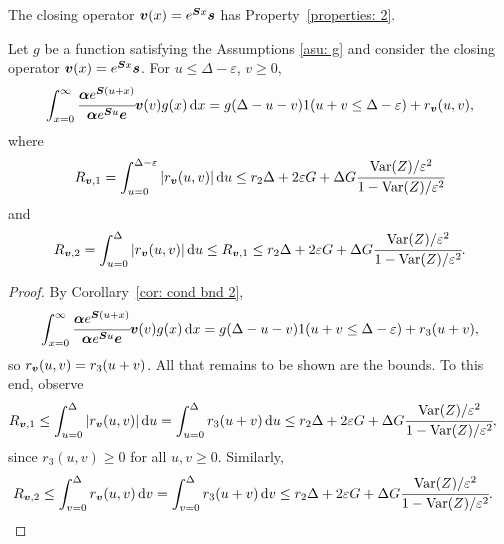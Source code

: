 \begin{cor}\label{cor: cond bnd 2 V}
	The closing operator \(\boldsymbol v(x)=e^{\boldsymbol S x}\boldsymbol s\) has Property~\ref{properties: 2}.

	Let \(g\) be a function satisfying the Assumptions \ref{asu: g} and consider the closing operator \({\boldsymbol v}(x)=e^{\boldsymbol Sx}\boldsymbol s\). For \(u\leq \Delta-\varepsilon \), \(v\geq 0\), 
	\[\int_{x=0}^\infty \cfrac{\boldsymbol \alpha  e^{\boldsymbol{S} (u+x)} }{\boldsymbol \alpha  e^{\boldsymbol{S} u} \boldsymbol e} {\boldsymbol v}(v)g(x)\, \mathrm{d} x = g(\Delta-u-v) 1(u+v\leq\Delta-\varepsilon) + r_{\boldsymbol v} (u,v),\]
	where \[\displaystyle R_{\boldsymbol v,1} = \int_{u=0}^{\Delta-\varepsilon}|r_{\boldsymbol v}(u,v)|\, \mathrm{d} u \leq r_2\Delta + 2\varepsilon G + \Delta G \cfrac{\mathrm{Var}(Z)/\varepsilon^2}{1-\mathrm{Var}(Z)/\varepsilon^2}\]
	and \[R_{\boldsymbol v,2} = \int_{u=0}^\Delta |r_{\boldsymbol v}(u,v)| \, \mathrm{d} u\leq R_{{\boldsymbol v},1}\leq r_2\Delta + 2\varepsilon G + \Delta G \cfrac{\mathrm{Var}(Z)/\varepsilon^2}{1-\mathrm{Var}(Z)/\varepsilon^2}.\] 
\end{cor}
\begin{proof}
	By Corollary~\ref{cor: cond bnd 2}, 
	\[\int_{x=0}^\infty \cfrac{\boldsymbol \alpha  e^{\boldsymbol{S} (u+x)} }{\boldsymbol \alpha  e^{\boldsymbol{S} u} \boldsymbol e} {\boldsymbol v}(v)g(x)\, \mathrm{d} x = g(\Delta-u-v) 1(u+v\leq\Delta-\varepsilon) + r_3 (u+v),\]
	so \(r_{\boldsymbol v}(u,v)=r_3(u+v)\). All that remains to be shown are the bounds. To this end, observe 
	\begin{align*}
		R_{{\boldsymbol v},1} \leq \displaystyle\int_{u=0}^{\Delta}|r_{\boldsymbol v}(u,v)|\, \mathrm{d} u 
		 &= \displaystyle\int_{u=0}^{\Delta} r_3(u+v)\, \mathrm{d} u 
		 \leq r_2\Delta + 2\varepsilon G + \Delta G \cfrac{\mathrm{Var}(Z)/\varepsilon^2}{1-\mathrm{Var}(Z)/\varepsilon^2},
	\end{align*}
	since \(r_{3}(u,v)\geq 0\) for all \(u,v\geq 0\). Similarly,
	\begin{align*}
		 R_{{\boldsymbol v},2} \leq \displaystyle\int_{v=0}^{\Delta}r_{\boldsymbol v}(u,v)\, \mathrm{d} v 
		 &= \displaystyle\int_{v=0}^{\Delta} r_3(u+v)\, \mathrm{d} v 
		 \leq r_2\Delta + 2\varepsilon G + \Delta G \cfrac{\mathrm{Var}(Z)/\varepsilon^2}{1-\mathrm{Var}(Z)/\varepsilon^2}.
	\end{align*}
\end{proof}

